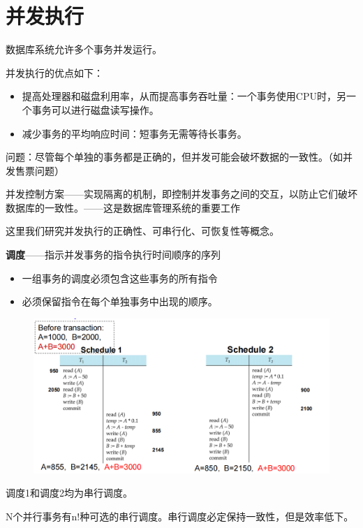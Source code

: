 \section{并发执行}

数据库系统允许多个事务并发运行。

并发执行的优点如下：
\begin{itemize}
    \item 提高处理器和磁盘利用率，从而提高事务吞吐量：一个事务使用CPU时，另一个事务可以进行磁盘读写操作。
    \item 减少事务的平均响应时间：短事务无需等待长事务。
\end{itemize}

问题：尽管每个单独的事务都是正确的，但并发可能会破坏数据的一致性。（如并发售票问题）

并发控制方案——实现隔离的机制，即控制并发事务之间的交互，以防止它们破坏数据库的一致性。——这是数据库管理系统的重要工作

这里我们研究并发执行的正确性、可串行化、可恢复性等概念。

\noindent\textbf{调度}——指示并发事务的指令执行时间顺序的序列
\begin{itemize}
    \item 一组事务的调度必须包含这些事务的所有指令
    \item 必须保留指令在每个单独事务中出现的顺序。
\end{itemize}

\begin{figure}[H]
    \centering
    \includegraphics[width=0.8\linewidth]{image4.png}
    \caption{}
    \label{}
\end{figure}

调度1和调度2均为串行调度。

N个并行事务有n!种可选的串行调度。串行调度必定保持一致性，但是效率低下。